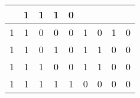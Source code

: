 \begin{tabular}{|c|c|c|c||c|c|c|c|c|}
    
    
    & 1
  
    
    
    & 1
  
    
    
    & 1
  
    
    
    & 0
   \\
  \hline

  
  
  1 & 1 & 0 & 0
  
    
    
    & 0
  
    
    
    & 1
  
    
    
    & 0
  
    
    
    & 1
  
    
    
    & 0
   \\
  

  
  
  1 & 1 & 0 & 1
  
    
    
    & 0
  
    
    
    & 1
  
    
    
    & 1
  
    
    
    & 0
  
    
    
    & 0
   \\
  

  
  
  1 & 1 & 1 & 0
  
    
    
    & 0
  
    
    
    & 1
  
    
    
    & 1
  
    
    
    & 0
  
    
    
    & 0
   \\
  

  
  
  1 & 1 & 1 & 1
  
    
    
    & 1
  
    
    
    & 0
  
    
    
    & 0
  
    
    
    & 0
  
    
    
    & 0
   \\
  \hline

\end{tabular}



